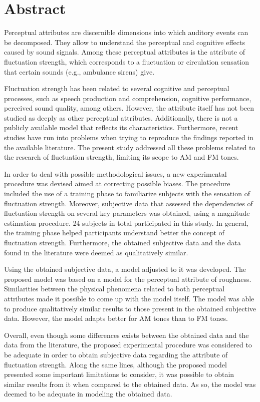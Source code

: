 \documentclass[main.tex]{subfiles}
\begin{document}
\chapter*{Abstract}

Perceptual attributes are discernible dimensions into which auditory events can
be decomposed. They allow to understand the perceptual and cognitive effects
caused by sound signals. Among these perceptual attributes is the attribute of
fluctuation strength, which corresponds to a fluctuation or circulation
sensation that certain sounds (e.g., ambulance sirens) give.

Fluctuation strength has been related to several cognitive and perceptual
processes, such as speech production and comprehension, cognitive performance,
perceived sound quality, among others. However, the attribute itself has not
been studied as deeply as other perceptual attributes. Additionally, there is
not a publicly available model that reflects its characteristics. Furthermore,
recent studies have run into problems when trying to reproduce the findings
reported in the available literature. The present study addressed all these
problems related to the research of fluctuation strength, limiting its scope
to \gls{AM} and \gls{FM} tones.

In order to deal with possible methodological issues, a new experimental
procedure was devised aimed at correcting possible biases. The procedure
included the use of a training phase to familiarize subjects with the sensation
of fluctuation strength. Moreover, subjective data that assessed the
dependencies of fluctuation strength on several key parameters was obtained,
using a magnitude estimation procedure. 24 subjects in total participated in
this study. In general, the training phase helped participants understand better
the concept of fluctuation strength. Furthermore, the obtained subjective data
and the data found in the literature were deemed as qualitatively similar.

Using the obtained subjective data, a model adjusted to it was developed. The
proposed model was based on a model for the perceptual attribute of
roughness. Similarities between the physical phenomena related to both
perceptual attributes made it possible to come up with the model itself.
The model was able to produce qualitatively similar results to those present
in the obtained subjective data. However, the model adapts better for \gls{AM}
tones than to \gls{FM} tones.

Overall, even though some differences exists between the obtained data and the
data from the literature, the proposed experimental procedure was considered
to be adequate in order to obtain subjective data regarding the attribute of
fluctuation strength. Along the same lines, although the proposed model
presented some important limitations to consider, it was possible to obtain
similar results from it when compared to the obtained data. As so, the model
was deemed to be adequate in modeling the obtained data.
\end{document}
